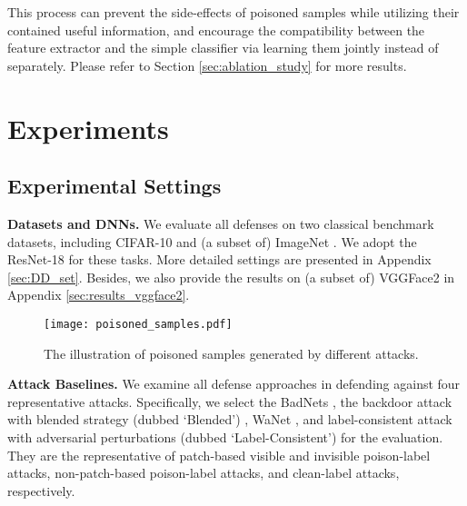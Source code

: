 This process can prevent the side-effects of poisoned samples while utilizing their contained useful information, and encourage the compatibility between the feature extractor and the simple classifier via learning them jointly instead of separately. Please refer to Section \ref{sec:ablation_study} for more results. 

\section{Experiments}

\subsection{Experimental Settings}
\noindent \textbf{Datasets and DNNs.}
We evaluate all defenses on two classical benchmark datasets, including CIFAR-10 \citep{krizhevsky2009learning} and (a subset of) ImageNet \citep{deng2009imagenet}. We adopt the ResNet-18 \citep{he2016deep} for these tasks. More detailed settings are presented in Appendix \ref{sec:DD_set}. Besides, we also provide the results on (a subset of) VGGFace2 \citep{cao2018vggface2} in Appendix \ref{sec:results_vggface2}.

\begin{figure*}
    \centering
    \texttt{[image: poisoned\_samples.pdf]}
    \vspace{-0.7em}
    \caption{The illustration of poisoned samples generated by different attacks. }
    \label{fig:poisoned_samples}
\end{figure*}

\noindent \textbf{Attack Baselines.} 
We examine all defense approaches in defending against four representative attacks. Specifically, we select the BadNets \citep{gu2017badnets}, the backdoor attack with blended strategy (dubbed `Blended') \citep{chen2017targeted}, WaNet \citep{nguyen2021wanet}, and label-consistent attack with adversarial perturbations (dubbed `Label-Consistent') \citep{turner2019label} for the evaluation. They are the representative of patch-based visible and invisible poison-label attacks, non-patch-based poison-label attacks, and clean-label attacks, respectively. 

